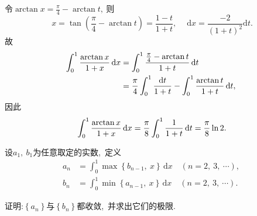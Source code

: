 	\begin{solution}
		令$\arctan x=\frac{\pi}{4}-\arctan t,\ $则
		$$x = \tan\left(\frac{\pi}{4}-\arctan t\right)=\frac{1-t}{1+t},\ \quad \text{d}x=\frac{-2}{\left(1+t\right)^2}\text{d}t.$$
		故
		\begin{align*}
			\int_{0}^{1}\frac{\arctan x}{1+x}\,\text d x&=\int_{0}^{1}\frac{\frac{\pi}{4}-\arctan t}{1+t}\,\text{d}t\\
			&=\frac{\pi}{4}\int_{0}^{1}\frac{\text{d}t}{1+t}-\int_{0}^{1}\frac{\arctan t}{1+t}\,\text{d}t,\ 
		\end{align*}
		因此
		$$\int_{0}^{1}\frac{\arctan x}{1+x}\,\text d x=\frac{\pi}{8}\int_{0}^{1}\frac{1}{1+t}\,\text{d}t=\frac{\pi}{8}\ln 2.$$
	\end{solution}
	\newpage
	\begin{problem}
		设$a_1,\ b_1$为任意取定的实数,\ 定义
		\begin{align}
			a_n&=\int_{0}^{1}\max\left\{b_{n-1},\ x\right\}\,\text{d}x\quad(n=2,\ 3,\ \cdots),\ \label{eq4}\\
			b_n&=\int_{0}^{1}\min\left\{a_{n-1},\ x\right\}\,\text{d}x\quad(n=2,\ 3,\ \cdots).\label{eq5}
		\end{align}
		
		证明:$\left\{a_n\right\}$与$\left\{b_n\right\}$都收敛,\ 并求出它们的极限.
	\end{problem}
	
